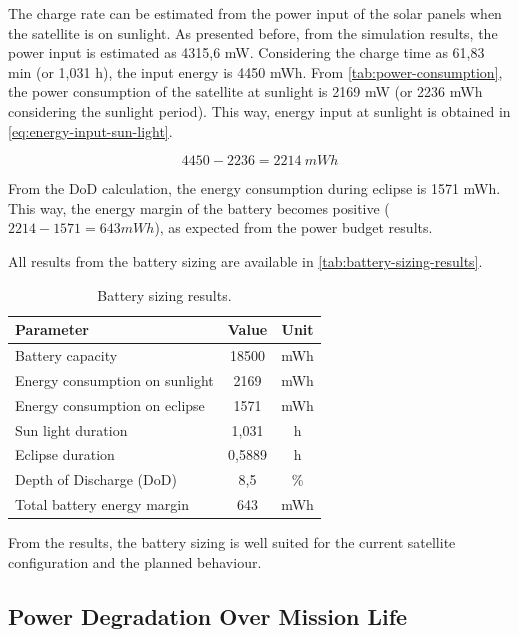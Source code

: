 The charge rate can be estimated from the power input of the solar panels when the satellite is on sunlight. As presented before, from the simulation results, the power input is estimated as 4315,6 mW. Considering the charge time as 61,83 min (or 1,031 h), the input energy is 4450 mWh. From \autoref{tab:power-consumption}, the power consumption of the satellite at sunlight is 2169 mW (or 2236 mWh considering the sunlight period). This way, energy input at sunlight is obtained in \autoref{eq:energy-input-sun-light}.

\begin{equation} \label{eq:energy-input-sun-light}
    4450 - 2236 = 2214\ mWh
\end{equation}

From the DoD calculation, the energy consumption during eclipse is 1571 mWh. This way, the energy margin of the battery becomes positive ($2214 - 1571 = 643 mWh$), as expected from the power budget results.

All results from the battery sizing are available in \autoref{tab:battery-sizing-results}.

\begin{table}[!h]
    \centering
    \begin{tabular}{lcc}
        \toprule[1.5pt]
        \textbf{Parameter} & \textbf{Value}    & \textbf{Unit} \\
        \midrule
        Battery capacity                & 18500  & mWh \\
        Energy consumption on sunlight & 2169   & mWh \\
        Energy consumption on eclipse   & 1571   & mWh \\
        Sun light duration              & 1,031  & h \\
        Eclipse duration                & 0,5889 & h \\
        Depth of Discharge (DoD)        & 8,5    & \% \\
        Total battery energy margin     & 643    & mWh \\
        \bottomrule[1.5pt]
    \end{tabular}
    \caption{Battery sizing results.}
    \label{tab:battery-sizing-results}
\end{table}

From the results, the battery sizing is well suited for the current satellite configuration and the planned behaviour.

\subsection{Power Degradation Over Mission Life}


